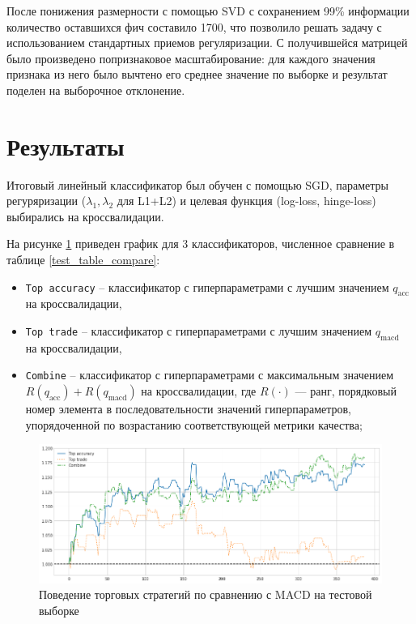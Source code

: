 \documentclass[14pt,a4paper]{extreport}
\begin{document}
После понижения размерности с помощью SVD\cite{svd} с сохранением
99\% информации количество оставшихся фич составило 1700, что позволило решать задачу с использованием стандартных
приемов регуляризации. С получившейся матрицей было произведено попризнаковое
масштабирование: для каждого значения признака из него было вычтено его среднее значение по выборке и результат поделен на
выборочное отклонение.

\section{Результаты}

Итоговый линейный классификатор был обучен с помощью SGD\cite{sgd}, параметры регуряризации ($\lambda_1,\lambda_2$ для L1+L2)
и целевая функция (log-loss, hinge-loss) выбирались на кроссвалидации.

На рисунке \ref{fig:vs_macd_on_test} приведен график для 3 классификаторов, численное сравнение в таблице \ref{test_table_compare}:

\begin{itemize}
\item \texttt{Top accuracy} -- классификатор с гиперпараметрами с лучшим значением $q_\text{acc}$ на кроссвалидации,
\item \texttt{Top trade} -- классификатор с гиперпараметрами с лучшим значением $q_\text{macd}$ на кроссвалидации,
\item \texttt{Combine} -- классификатор с гиперпараметрами с максимальным значением $R(q_\text{acc}) + R(q_\text{macd})$ на кроссвалидации,
где $R(\cdot)$ --- ранг, порядковый номер элемента в последовательности значений гиперпараметров, упорядоченной по возрастанию
соответствующей метрики качества;
\end{itemize}

\begin{figure}[h]
\includegraphics[width=\linewidth]{vs_macd_on_test}
\caption{Поведение торговых стратегий по сравнению с MACD на тестовой выборке \label{fig:vs_macd_on_test}}
\end{figure}
\end{document}

